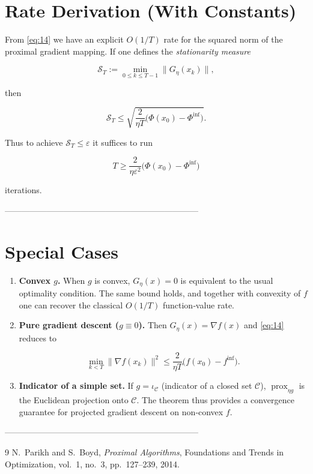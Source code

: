 \documentclass{article}
\newcommand{\prox}{\operatorname{prox}}
\newcommand{\grad}{\nabla}
\begin{document}
\section*{Rate Derivation (With Constants)}
From \eqref{eq:14} we have an explicit $O(1/T)$ rate for the squared norm of the proximal gradient mapping.  If one defines the \emph{stationarity measure}  

\[
\mathcal{S}_{T}:=\min_{0\le k\le T-1}\|G_{\eta}(x_{k})\|,
\]

then  

\[
\mathcal{S}_{T}\le
\sqrt{\frac{2}{\eta T}\bigl(\Phi(x_{0})-\Phi^{\inf}\bigr)}.
\]

Thus to achieve $\mathcal{S}_{T}\le\varepsilon$ it suffices to run  

\[
T\ge \frac{2}{\eta\varepsilon^{2}}\bigl(\Phi(x_{0})-\Phi^{\inf}\bigr)
\]

iterations.

---------------------------------------------------------------------

\section*{Special Cases}
\begin{enumerate}
\item \textbf{Convex $g$.} When $g$ is convex, $G_{\eta}(x)=0$ is equivalent to the usual optimality condition. The same bound holds, and together with convexity of $f$ one can recover the classical $O(1/T)$ function‑value rate.
\item \textbf{Pure gradient descent ($g\equiv0$).} Then $G_{\eta}(x)=\grad f(x)$ and \eqref{eq:14} reduces to  

\[
\min_{k<T}\|\grad f(x_{k})\|^{2}\le\frac{2}{\eta T}\bigl(f(x_{0})-f^{\inf}\bigr).
\]

\item \textbf{Indicator of a simple set.} If $g=\iota_{\mathcal{C}}$ (indicator of a closed set $\mathcal{C}$), $\prox_{\eta g}$ is the Euclidean projection onto $\mathcal{C}$. The theorem thus provides a convergence guarantee for projected gradient descent on non‑convex $f$.
\end{enumerate}

---------------------------------------------------------------------

\begin{thebibliography}{9}
N.~Parikh and S.~Boyd, \emph{Proximal Algorithms}, Foundations and Trends in Optimization, vol.~1, no.~3, pp.~127–239, 2014.
\end{thebibliography}
\end{document}
